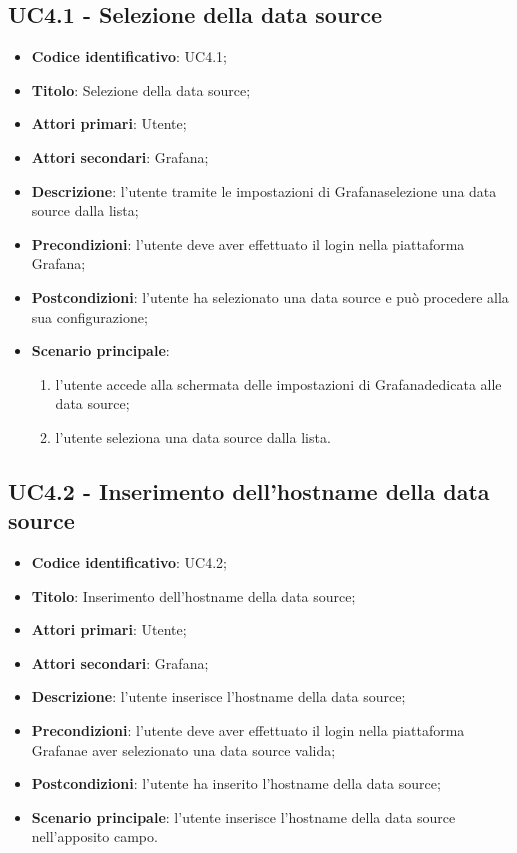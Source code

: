     \subsection{UC4.1 - Selezione della data source}
        \begin{itemize}
            \item \textbf{Codice identificativo}: UC4.1;
            \item \textbf{Titolo}: Selezione della data source;
            \item \textbf{Attori primari}: Utente;
            \item \textbf{Attori secondari}: Grafana\glo;
            \item \textbf{Descrizione}: l'utente tramite le impostazioni di Grafana\glosp selezione una data source dalla lista;
            \item \textbf{Precondizioni}: l'utente deve aver effettuato il login nella piattaforma Grafana\glo;
            \item \textbf{Postcondizioni}: l'utente ha selezionato una data source e può procedere alla sua configurazione;
            \item \textbf{Scenario principale}:
            \begin{enumerate}
                \item l'utente accede alla schermata delle impostazioni di Grafana\glosp dedicata alle data source;
                \item l'utente seleziona una data source dalla lista.
            \end{enumerate}
        \end{itemize}
    \subsection{UC4.2 - Inserimento dell'hostname della data source}
        \begin{itemize}
            \item \textbf{Codice identificativo}: UC4.2;
            \item \textbf{Titolo}: Inserimento dell'hostname della data source;
            \item \textbf{Attori primari}: Utente;
            \item \textbf{Attori secondari}: Grafana\glo;
            \item \textbf{Descrizione}: l'utente inserisce l'hostname della data source;
            \item \textbf{Precondizioni}: l'utente deve aver effettuato il login nella piattaforma Grafana\glo e aver selezionato una                                  data source valida;
            \item \textbf{Postcondizioni}: l'utente ha inserito l'hostname della data source;
            \item \textbf{Scenario principale}: l'utente inserisce l'hostname della data source nell'apposito campo.
        \end{itemize}
